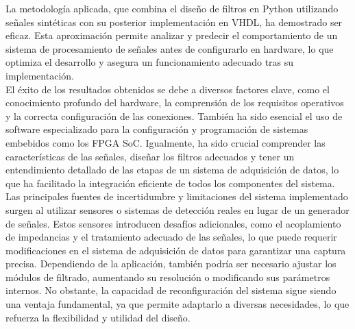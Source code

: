 \documentclass{report}
\begin{document}
\noindent La metodología aplicada, que combina el diseño de filtros en Python utilizando señales sintéticas con su posterior implementación en VHDL, ha demostrado ser eficaz. Esta aproximación permite analizar y predecir el comportamiento de un sistema de procesamiento de señales antes de configurarlo en hardware, lo que optimiza el desarrollo y asegura un funcionamiento adecuado tras su implementación.\\

\noindent El éxito de los resultados obtenidos se debe a diversos factores clave, como el conocimiento profundo del hardware, la comprensión de los requisitos operativos y la correcta configuración de las conexiones. También ha sido esencial el uso de software especializado para la configuración y programación de sistemas embebidos como los FPGA SoC. Igualmente, ha sido crucial comprender las características de las señales, diseñar los filtros adecuados y tener un entendimiento detallado de las etapas de un sistema de adquisición de datos, lo que ha facilitado la integración eficiente de todos los componentes del sistema.\\

\noindent Las principales fuentes de incertidumbre y limitaciones del sistema implementado surgen al utilizar sensores o sistemas de detección reales en lugar de un generador de señales. Estos sensores introducen desafíos adicionales, como el acoplamiento de impedancias y el tratamiento adecuado de las señales, lo que puede requerir modificaciones en el sistema de adquisición de datos para garantizar una captura precisa. Dependiendo de la aplicación, también podría ser necesario ajustar los módulos de filtrado, aumentando su resolución o modificando sus parámetros internos. No obstante, la capacidad de reconfiguración del sistema sigue siendo una ventaja fundamental, ya que permite adaptarlo a diversas necesidades, lo que refuerza la flexibilidad y utilidad del diseño.

\listoffigures 

\newpage


\end{document}
